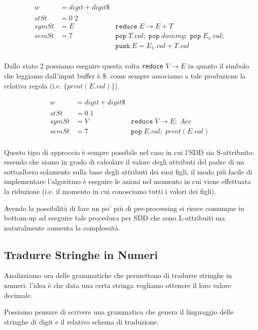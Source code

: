 \documentclass[class=book, crop=false, oneside, 12pt]{standalone}
\begin{document}
\begin{align*}
    w &= \underline{digit + digit}\$ \\
    stSt &= 0\; 2 \\
    symSt &= E &\texttt{reduce}\; E \to E + T\\     
    semSt &= 7 &\texttt{pop}\;T.val;\; \texttt{pop}\;dummy;\; \texttt{pop}\;E_1.val;\\ 
    && \texttt{push}\;E = E_1.val + T.val\\
\end{align*}

Dallo stato 2 possiamo eseguire questa volta \texttt{reduce} \(V \to E\) in quanto il simbolo che leggiamo dall'input buffer è \$: come sempre associamo a tale produzione la relativa regola (i.e. \(\{print(E.val)\}\)).

\begin{align*}
    w &= \underline{digit + digit}\$ \\
    stSt &= 0\; 1 \\
    symSt &= V &\texttt{reduce}\; V \to E;\; Acc \\     
    semSt &= 7 &\texttt{pop}\;E.val;\; print(E.val)\\
\end{align*}

Questo tipo di approccio è sempre possibile nel caso in cui l'SDD sia S-attribuito: essendo che siamo in grado di calcolare il valore degli attributi del padre di un sottoalbero solamente sulla base degli attributi dei suoi figli, il modo più facile di implementare l'algoritmo è eseguire le azioni nel momento in cui viene effettuata la riduzione (i.e. il momento in cui conosciamo tutti i valori dei figli). 

Avendo la possibilità di fare un po' più di pre-processing si riesce comunque in bottom-up ad eseguire tale procedura per SDD che sono L-attribuiti ma naturalmente aumenta la complessità. 

\subsection{Tradurre Stringhe in Numeri}

Analizziamo ora delle grammatiche che permettono di tradurre stringhe in numeri: l'idea è che data una certa stringa vogliamo ottenere il loro valore decimale. 

Possiamo pensare di scrivere una grammatica che genera il linguaggio delle stringhe di digit e il relativo schema di traduzione. 
\end{document}
